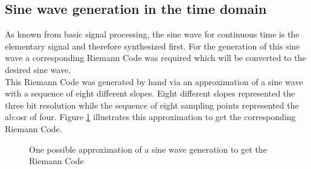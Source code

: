 \subsection{Sine wave generation in the time domain}
As known from basic signal processing, the sine wave for continuous time is the elementary signal and therefore synthesized first. 
For the generation of this sine wave a corresponding Riemann Code was required which will be converted to the desired sine wave.\\
This Riemann Code was generated by hand via an approximation of a sine wave with a sequence of eight different slopes.
Eight different slopes represented the three bit resolution while the sequence of eight sampling points represented the \gls{ab:osr} of four. 
Figure \ref{fig:RiemannCodeGenerationSineWave} illustrates this approximation to get the corresponding Riemann Code.



\begin{figure}[htb!]
   \centering 
   
   \caption{One possible approximation of a sine wave generation to get the Riemann Code}
   \label{fig:RiemannCodeGenerationSineWave}
\end{figure}


